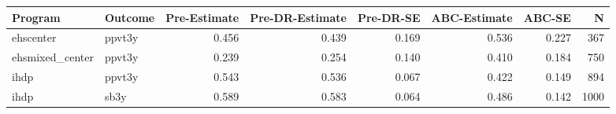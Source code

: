 \begin{table}[ht]
\centering
\begin{tabular}{llrrrrrr}
  \hline
Program & Outcome & Pre-Estimate & Pre-DR-Estimate & Pre-DR-SE & ABC-Estimate & ABC-SE & N \\ 
  \hline
ehscenter & ppvt3y & 0.456 & 0.439 & 0.169 & 0.536 & 0.227 & 367 \\ 
  ehsmixed\_center & ppvt3y & 0.239 & 0.254 & 0.140 & 0.410 & 0.184 & 750 \\ 
  ihdp & ppvt3y & 0.543 & 0.536 & 0.067 & 0.422 & 0.149 & 894 \\ 
  ihdp & sb3y & 0.589 & 0.583 & 0.064 & 0.486 & 0.142 & 1000 \\ 
   \hline
\end{tabular}
\end{table}
